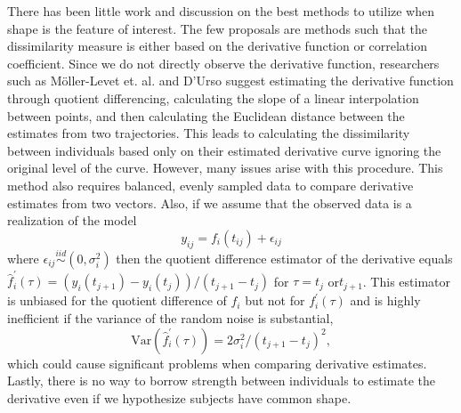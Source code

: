 \documentclass[12pt]{article}
\begin{document}
There has been little work and discussion on the best methods to utilize when shape is the feature of interest. The few proposals are methods such that the dissimilarity measure is either based on the derivative function or correlation coefficient. Since we do not directly observe the derivative function, researchers such as M\"{o}ller-Levet et. al. \cite{moller2003} and D'Urso \cite{d2000} suggest estimating the derivative function through quotient differencing, calculating the slope of a linear interpolation between points, and then calculating the Euclidean distance between the estimates from two trajectories. This leads to calculating the dissimilarity between individuals based only on their estimated derivative curve ignoring the original level of the curve. However, many issues arise with this procedure. This method also requires balanced, evenly sampled data to compare derivative estimates from two vectors. Also, if we assume that the observed data is a realization of the model
$$y_{ij}= f_i(t_{ij})+\epsilon_{ij}$$
where $\epsilon_{ij}\overset{iid}{\sim} (0,\sigma_{i}^{2})$ then the quotient difference estimator of the derivative equals $\hat{f}_{i}^{'}(\tau) = (y_i(t_{j+1})-y_i(t_j))/(t_{j+1}-t_j)$ for $\tau= t_{j}$ or$ t_{j+1}$. This estimator is unbiased for the quotient difference of $f_{i}$ but not for $f_{i}^{'}(\tau)$ and is highly inefficient if the variance of the random noise is substantial,
$$\text{Var}(\hat{f}_{i}^{'}(\tau)) =  2\sigma^{2}_{i}/ (t_{j+1}-t_j)^{2},$$
which could cause significant problems when comparing derivative estimates. Lastly, there is no way to borrow strength between individuals to estimate the derivative even if we hypothesize subjects have common shape.  \\ 
\end{document}
